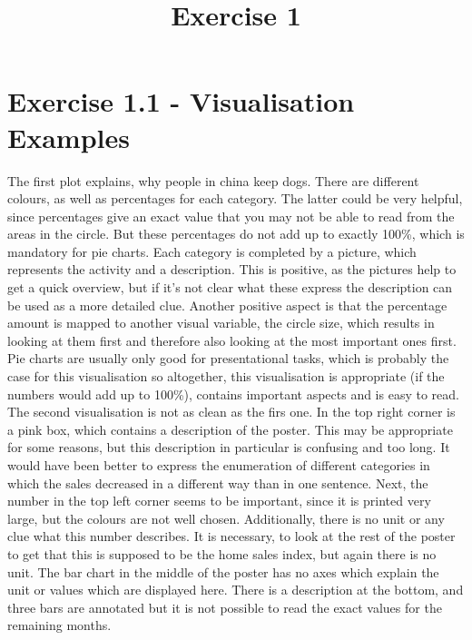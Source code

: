 \documentclass[a4paper]{article}
\date{}
\author{}
\title{Exercise 1}
\begin{document}
	
	\maketitle 
	\thispagestyle{fancy}
	
	\section*{Exercise 1.1 - Visualisation Examples}
	
	The first plot explains, why people in china keep dogs. 
	There are different colours, as well as percentages for each category. 
	The latter could be very helpful, since percentages give an exact value that you may not be able to read from the areas in the circle. 
	But these percentages do not add up to exactly 100\%, which is mandatory for pie charts.
	Each category is completed by a picture, which represents the activity and a description. 
	This is positive, as the pictures help to get a quick overview, but if it's not clear what these express the description can be used as a more detailed clue. 
	Another positive aspect is that the percentage amount is mapped to another visual variable, the circle size, which results in looking at them first and therefore also looking at the most important ones first.
	Pie charts are usually only good for presentational tasks, which is probably the case for this visualisation so altogether, this visualisation is appropriate (if the numbers would add up to 100\%), contains important aspects and is easy to read. 
	\\ \linebreak
	The second visualisation is not as clean as the firs one. 
	In the top right corner is a pink box, which contains a description of the poster. 
	This may be appropriate for some reasons, but this description in particular is confusing and too long. 
	It would have been better to express the enumeration of different categories in which the sales decreased in a different way than in one sentence. 
	Next, the number in the top left corner seems to be important, since it is printed very large, but the colours are not well chosen. 
	Additionally, there is no unit or any clue what this number describes. 
	It is necessary, to look at the rest of the poster to get that this is supposed to be the home sales index, but again there is no unit. 
	The bar chart in the middle of the poster has no axes which explain the unit or values which are displayed here. 
	There is a description at the bottom, and three bars are annotated but it is not possible to read the exact values for the remaining months. 
\end{document}
